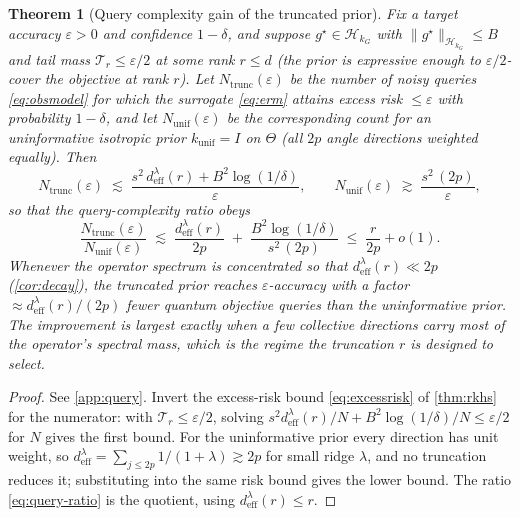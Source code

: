\documentclass[aps,prxquantum,reprint,amsmath,amssymb,floatfix,nofootinbib,superscriptaddress,longbibliography]{revtex4-2}
\newtheorem{theorem}{Theorem}
\theoremstyle{remark}
\begin{document}
\begin{theorem}[Query complexity gain of the truncated prior]
\label{thm:query}
Fix a target accuracy \(\varepsilon>0\) and confidence \(1-\delta\), and suppose
\(g^{\star}\in\mathcal H_{k_G}\) with \(\|g^{\star}\|_{\mathcal H_{k_G}}\le B\) and
tail mass \(\mathcal T_{r}\le\varepsilon/2\) at some rank \(r\le d\) (the prior is
expressive enough to \(\varepsilon/2\)-cover the objective at rank \(r\)). Let
\(N_{\mathrm{trunc}}(\varepsilon)\) be the number of noisy queries
\eqref{eq:obsmodel} for which the surrogate \eqref{eq:erm} attains excess risk
\(\le\varepsilon\) with probability \(1-\delta\), and let
\(N_{\mathrm{unif}}(\varepsilon)\) be the corresponding count for an
uninformative isotropic prior \(k_{\mathrm{unif}}=I\) on \(\Theta\) (all \(2p\)
angle directions weighted equally). Then
\begin{equation}
    N_{\mathrm{trunc}}(\varepsilon)
    \;\lesssim\;
    \frac{s^2\,d_{\mathrm{eff}}^{\lambda}(r)+B^2\log(1/\delta)}{\varepsilon},
    \qquad
    N_{\mathrm{unif}}(\varepsilon)
    \;\gtrsim\;
    \frac{s^2\,(2p)}{\varepsilon},
    \label{eq:query-counts}
\end{equation}
so that the query-complexity ratio obeys
\begin{equation}
    \frac{N_{\mathrm{trunc}}(\varepsilon)}{N_{\mathrm{unif}}(\varepsilon)}
    \;\lesssim\;
    \frac{d_{\mathrm{eff}}^{\lambda}(r)}{2p}
    \;+\;\frac{B^2\log(1/\delta)}{s^2\,(2p)}
    \;\le\;
    \frac{r}{2p}+o(1).
    \label{eq:query-ratio}
\end{equation}
Whenever the operator spectrum is concentrated so that
\(d_{\mathrm{eff}}^{\lambda}(r)\ll 2p\) (\cref{cor:decay}), the truncated prior
reaches \(\varepsilon\)-accuracy with a factor
\(\approx d_{\mathrm{eff}}^{\lambda}(r)/(2p)\) fewer quantum objective queries
than the uninformative prior. The improvement is largest exactly when a few
collective directions carry most of the operator's spectral mass, which is the
regime the truncation \(r\) is designed to select.
\end{theorem}

\begin{proof}
See \cref{app:query}. Invert the excess-risk bound \eqref{eq:excessrisk} of
\cref{thm:rkhs} for the numerator: with \(\mathcal T_r\le\varepsilon/2\), solving
\(s^2 d_{\mathrm{eff}}^{\lambda}(r)/N+B^2\log(1/\delta)/N\le\varepsilon/2\) for
\(N\) gives the first bound. For the uninformative prior every direction has unit
weight, so \(d_{\mathrm{eff}}^{\lambda}=\sum_{j\le 2p}1/(1+\lambda)\gtrsim 2p\)
for small ridge \(\lambda\), and no truncation reduces it; substituting into the
same risk bound gives the lower bound. The ratio \eqref{eq:query-ratio} is the
quotient, using \(d_{\mathrm{eff}}^{\lambda}(r)\le r\).
\end{proof}
\end{document}
